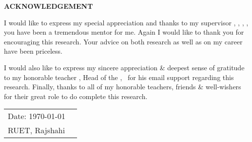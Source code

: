 \documentclass[document.tex]{subfiles}
\begin{document}

\begin{center}
\textbf{{\fontsize{16pt}{0.5cm}\selectfont ACKNOWLEDGEMENT}}
\vspace{1cm}
\end{center}

\vfill
\noindent I would like to express my special appreciation and thanks to my supervisor \textbf{\thesissupervisor}, \thesissupervisordesignation, \deptT, \ruet, you have been a tremendous mentor for me. Again I would like to thank you for encouraging this research. Your advice on both research as well as on my career have been priceless. 

\noindent I would also like to express my sincere appreciation \& deepest sense of gratitude to my honorable teacher \textbf{\depthead}, Head of the \deptT, \ruet \, for his email support regarding this research.
\noindent Finally, thanks to all of my honorable teachers, friends \& well-wishers for their great role to do complete this research.

\vspace*{\fill}
\noindent
\begin{tabularx}{\textwidth}{X X}
  {\fontsize{14pt}{0.5cm}\selectfont Date: \today} & \raggedleft { \fontsize{14pt}{0.5cm}\selectfont \authorname }\tabularnewline
{\fontsize{14pt}{0.5cm}\selectfont RUET, Rajshahi} & \tabularnewline
\end{tabularx}



\clearpage
\end{document}
